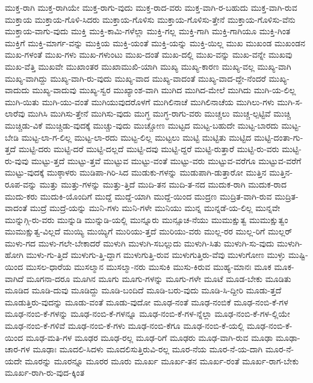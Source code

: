 {ಮುಕ್ತ-ರಾಗಿ
ಮುಕ್ತ-ರಾಗಿಯೇ
ಮುಕ್ತ-ರಾಗು-ವುದು
ಮುಕ್ತ-ರಾದ-ವರು
ಮುಕ್ತ-ವಾಗಿ-ರ-ಬಹುದು
ಮುಕ್ತ-ವಾಗಿ-ರುವ
ಮುಕ್ತಾಯ
ಮುಕ್ತಾಯ-ಗೊಳಿ-ಸಿದರು
ಮುಕ್ತಾಯ-ಗೊಳಿಸು
ಮುಕ್ತಾಯ-ಗೊಳಿಸು-ತ್ತೇನೆ
ಮುಕ್ತಾಯ-ಗೊಳಿಸು-ವೆನು
ಮುಕ್ತಾಯ-ವಾಗು-ವುದು
ಮುಕ್ತಿ
ಮುಕ್ತಿ-ಕಾಮಿ-ಗಳೆಲ್ಲಾ
ಮುಕ್ತಿ-ಗಲ್ಲ
ಮುಕ್ತಿ-ಗಾಗಿ
ಮುಕ್ತಿ-ಗಾಗಿಯೂ
ಮುಕ್ತಿ-ಗಿಂತ
ಮುಕ್ತಿಗೆ
ಮುಕ್ತಿ-ಮಾರ್ಗ-ವನ್ನು
ಮುಕ್ತಿಯ
ಮುಕ್ತಿ-ಯಂತೆ
ಮುಕ್ತಿ-ಯನ್ನು
ಮುಕ್ತಿ-ಯಿಲ್ಲ
ಮುಖ
ಮುಖಂಡ
ಮುಖಂಡನ
ಮುಖ-ಗಳಂತೆ
ಮುಖ-ಗಳು
ಮುಖ-ಗಳುಂಟು
ಮುಖ-ದಂತೆ
ಮುಖ-ದಲ್ಲಿ
ಮುಖ-ವನ್ನು
ಮುಖ-ವನ್ನೇ
ಮುಖವು
ಮುಖ-ವೆತ್ತಿ
ಮುಖವೇ
ಮುಖಾಂತರ
ಮುಖಾಮುಖಿ-ಯಾಗಿ
ಮುಖ್ಯ
ಮುಖ್ಯ-ಕಾರಣ
ಮುಖ್ಯ-ವಲ್ಲ
ಮುಖ್ಯ-ವಾಗಿ
ಮುಖ್ಯ-ವಾಗಿದ್ದು
ಮುಖ್ಯ-ವಾಗಿ-ರು-ವುದು
ಮುಖ್ಯ-ವಾದ
ಮುಖ್ಯ-ವಾದಂತೆ
ಮುಖ್ಯ-ವಾದ-ದ್ದೇ-ನೆಂದರೆ
ಮುಖ್ಯ-ವಾದುದು
ಮುಖ್ಯ-ವಾದುವು
ಮುಖ್ಯ-ಸ್ವರ
ಮುಖ್ಯಾಂಶ-ವಾಗಿ
ಮುಗಿದ
ಮುಗಿದ-ಮೇಲೆ
ಮುಗಿದು
ಮುಗಿ-ಯ-ಲಿಲ್ಲ
ಮುಗಿ-ಯಿತು
ಮುಗಿ-ಯು-ವಂತೆ
ಮುಗಿಯುವುದರೊಳಗೆ
ಮುಗಿಲಿನಾಚೆ
ಮುಗಿಲಿನಾಚೆಯ
ಮುಗಿಲು-ಗಳು
ಮುಗಿ-ಸ-ಲಾರೆವು
ಮುಗಿಸಿ
ಮುಗಿಸು-ತ್ತೇನೆ
ಮುಗಿಸು-ವುದು
ಮುಗ್ಧ
ಮುಗ್ಧ-ರಾಗು-ವರು
ಮುಚ್ಚಲು
ಮುಚ್ಚ-ಲ್ಪಟ್ಟಿವೆ
ಮುಚ್ಚಿ
ಮುಚ್ಚಿಡು-ವಿಕೆ
ಮುಚ್ಚಿಡು-ವುದಕ್ಕೆ
ಮುಚ್ಚು-ವುದು
ಮುಚ್ಚೋಣ
ಮುಟ್ಟದ
ಮುಟ್ಟ-ಬಹುದೇ
ಮುಟ್ಟ-ಬಾರದು
ಮುಟ್ಟ-ಬೇಡಿ
ಮುಟ್ಟ-ಲಾ-ಗ-ಲಿಲ್ಲ
ಮುಟ್ಟ-ಲಾ-ರದು
ಮುಟ್ಟ-ಲಿಲ್ಲ
ಮುಟ್ಟಲು
ಮುಟ್ಟಿ
ಮುಟ್ಟಿತು
ಮುಟ್ಟಿದ
ಮುಟ್ಟಿ-ದಂತಾ-ಗು-ತ್ತದೆ
ಮುಟ್ಟಿ-ದರು
ಮುಟ್ಟಿ-ದರೆ
ಮುಟ್ಟಿ-ದಲ್ಲದೆ
ಮುಟ್ಟಿ-ದವು
ಮುಟ್ಟಿ-ದ್ದರೆ
ಮುಟ್ಟಿ-ರುತ್ತಾರೆ
ಮುಟ್ಟಿ-ರು-ವರು
ಮುಟ್ಟಿ-ರು-ವುವು
ಮುಟ್ಟು-ತ್ತದೆ
ಮುಟ್ಟು-ತ್ತವೆ
ಮುಟ್ಟುವ
ಮುಟ್ಟು-ವಂತೆ
ಮುಟ್ಟು-ವರು
ಮುಟ್ಟುವ-ವರೆಗೂ
ಮುಟ್ಟುವ-ವರೆಗೆ
ಮುಟ್ಟು-ವುದಕ್ಕೆ
ಮುಠ್ಠಾಳರು
ಮುಡಿಪಾ-ಗಿರಿ-ಸಿದ
ಮುಡುಕು-ಗಳನ್ನು
ಮುಡುಪಾಗಿ-ಡುತ್ತಾರೋ
ಮುತ್ತಿನ
ಮುತ್ತಿನ-ರೂಪ-ವನ್ನು
ಮುತ್ತು
ಮುತ್ತು-ಗಳನ್ನು
ಮುತ್ತು-ತ್ತಿದೆ
ಮುದಿ-ತನ
ಮುದಿ-ತ-ನದ
ಮುದುಕ-ರಾಗಿ
ಮುದುಕ-ರಾದ
ಮುದು-ಕರು
ಮುದುಕಿ-ಯೊಂದಿಗೆ
ಮುದ್ದೆ
ಮುದ್ದೆ-ಯಾಗಿ
ಮುದ್ದೆ-ಯಿಂದ
ಮುದ್ರಣ
ಮುದ್ರಿತ-ವಾಗಿ-ರುವ
ಮುದ್ರಿತ-ವಾದಂತೆ
ಮುದ್ರೆ
ಮುದ್ರೆ-ಯನ್ನು
ಮುನಿ-ಗಳು
ಮುನಿ-ಗಳೇ
ಮುನಿಯು
ಮುನ್ನ
ಮುನ್ನಡೆ-ಯ-ಲಿಲ್ಲ
ಮುನ್ನವೇ
ಮುನ್ನುಗ್ಗಿ-ರು-ವರು
ಮುನ್ನುಡಿ
ಮುನ್ನುಡಿ-ಯಲ್ಲಿ
ಮುನ್ನೂರು
ಮುನ್ಸೂಚ-ನೆಯು
ಮುಮುಕ್ಷುತ್ವ
ಮುಮುಕ್ಷುತ್ವಂ
ಮುಮುಕ್ಷುತ್ವ-ವಿಲ್ಲದೆ
ಮುಯ್ಯಿ
ಮುಯ್ಯಿಗೆ
ಮುರಿಯು-ತ್ತದೆ
ಮುರಿಯು-ವರು
ಮುಲ್ಲ-ರರ
ಮುಲ್ಲ-ರಿಗೆ
ಮುಲ್ಲರ್
ಮುಳು-ಗದ
ಮುಳು-ಗಲೇ-ಬೇಕಾದರೆ
ಮುಳುಗಿ
ಮುಳುಗಿ-ಸಬಲ್ಲುದು
ಮುಳುಗಿ-ಸಿತು
ಮುಳುಗಿ-ಸು-ವುದು
ಮುಳುಗಿ-ಹೋಗಿ
ಮುಳು-ಗು-ತ್ತಿದೆ
ಮುಳುಗು-ತ್ತಿ-ದ್ದಾಗ
ಮುಳುಗುತ್ತಿ-ರುವ
ಮುಳುಗುತ್ತಿರು-ವೆವು
ಮುಳುಗೋಣ
ಮುಳ್ಳು
ಮುಷ್ಟಿ-ಯಿಂದ
ಮುಸಲ-ಧಾರೆಯ
ಮುಸಲ್ಮಾನ
ಮುಸಲ್ಮಾ-ನರು
ಮುಸುಕಿ
ಮುಸು-ಕಿರುವ
ಮುಹ್ಯ-ಮಾನಃ
ಮೂಕ
ಮೂಕ-ವಾಗಿದೆ
ಮೂಗನಾ-ದರೂ
ಮೂಗಿನ
ಮೂಗು
ಮೂಗು-ಗಳನ್ನು
ಮೂಗು-ಗಳೇ
ಮೂಟೆ
ಮೂಡ-ಬೇಕು
ಮೂಡಿತು
ಮೂಡಿದ
ಮೂಡಿ-ದುವು
ಮೂಡಿದ್ದು
ಮೂಡಿ-ಬಂದಿದೆ
ಮೂಡಿ-ಬರು-ವುದು
ಮೂಡಿ-ಸಿ-ದ್ದೀರಿ
ಮೂಡು-ತ್ತದೆ
ಮೂಡುತ್ತಿರು-ವುದನ್ನು
ಮೂಡು-ವಂತೆ
ಮೂಡು-ವುದೋ
ಮೂಢ-ನಂತೆ
ಮೂಢ-ನಂಬಿಕೆ
ಮೂಢ-ನಂಬಿ-ಕೆ-ಗಳ
ಮೂಢ-ನಂಬಿ-ಕೆ-ಗಳನ್ನು
ಮೂಢ-ನಂಬಿ-ಕೆ-ಗಳನ್ನೂ
ಮೂಢ-ನಂಬಿ-ಕೆ-ಗಳ-ನ್ನೆಲ್ಲಾ
ಮೂಢ-ನಂಬಿ-ಕೆ-ಗಳ-ಲ್ಲಿಯೇ
ಮೂಢ-ನಂಬಿ-ಕೆ-ಗಳಿವೆ
ಮೂಢ-ನಂಬಿ-ಕೆ-ಗಳು
ಮೂಢ-ನಂಬಿ-ಕೆಗೂ
ಮೂಢ-ನಂಬಿ-ಕೆ-ಯಲ್ಲಿ
ಮೂಢ-ನಂಬಿ-ಕೆ-ಯಿಂದ
ಮೂಢ-ಮತಿ-ಗಳ
ಮೂಢರ
ಮೂಢ-ರಲ್ಲ
ಮೂಢ-ರಿಗೆ
ಮೂಢರು
ಮೂಢ-ವಾಗಿ-ರುವ
ಮೂಢಾ
ಮೂಢಾ-ಚಾರ-ಗಳ
ಮೂಢಾಃ
ಮೂದಲಿ-ಸಿದಳು
ಮೂದಲಿಸುತ್ತಿರುವಿ-ರಲ್ಲ
ಮೂರ-ನೆಯ
ಮೂರ-ನೆ-ಯ-ದಾಗಿ
ಮೂರ-ನೆ-ಯದೇ
ಮೂರನ್ನು
ಮೂರನ್ನೂ
ಮೂರರ
ಮೂರು
ಮೂರ್ಖ
ಮೂರ್ಖ-ತನ
ಮೂರ್ಖ-ರಂತೆ
ಮೂರ್ಖ-ರಾಗ-ಬೇಕು
ಮೂರ್ಖ-ರಾಗಿ-ರು-ವುದ-ಕ್ಕಿಂತ
}
